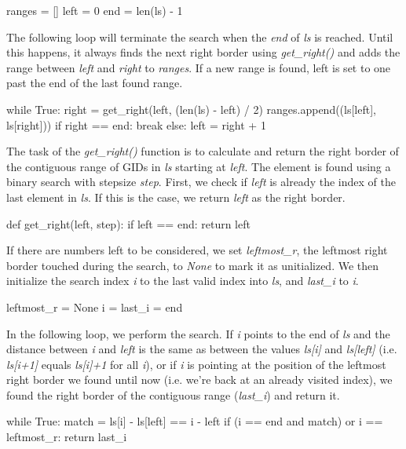 \documentclass{frontiersSCNS} %
\begin{document}
\begin{pythoncode}
ranges = []
left = 0
end = len(ls) - 1
\end{pythoncode}

The following loop will terminate the search when the \emph{end} of
\emph{ls} is reached. Until this happens, it always finds the next
right border using \emph{get\_right()} and adds the range between
\emph{left} and \emph{right} to \emph{ranges}. If a new range is
found, left is set to one past the end of the last found range.

\begin{pythoncode}
while True:
    right = get_right(left, (len(ls) - left) / 2)
    ranges.append((ls[left], ls[right]))
    if right == end:
        break
    else:
        left = right + 1
\end{pythoncode}

The task of the \emph{get\_right()} function is to calculate and
return the right border of the contiguous range of GIDs in \emph{ls}
starting at \emph{left}. The element is found using a binary search
with stepsize \emph{step}. First, we check if \emph{left} is already
the index of the last element in \emph{ls}. If this is the case, we
return \emph{left} as the right border.

\begin{pythoncode}
def get_right(left, step):
    if left == end:
        return left
\end{pythoncode}

If there are numbers left to be considered, we set \emph{leftmost\_r},
the leftmost right border touched during the search, to \emph{None} to
mark it as unitialized. We then initialize the search index \emph{i}
to the last valid index into \emph{ls}, and \emph{last\_i} to \emph{i}.

\begin{pythoncode}
    leftmost_r = None
    i = last_i = end
\end{pythoncode}

In the following loop, we perform the search. If \emph{i} points to
the end of \emph{ls} and the distance between \emph{i} and \emph{left}
is the same as between the values \emph{ls[i]} and \emph{ls[left]}
(i.e. \emph{ls[i+1]} equals \emph{ls[i]+1} for all \emph{i}), or if
\emph{i} is pointing at the position of the leftmost right border we
found until now (i.e. we're back at an already visited index), we
found the right border of the contiguous range (\emph{last\_i}) and
return it.

\begin{pythoncode}
    while True:
        match = ls[i] - ls[left] == i - left
        if (i == end and match) or i == leftmost_r:
            return last_i
\end{pythoncode}
\end{document}
